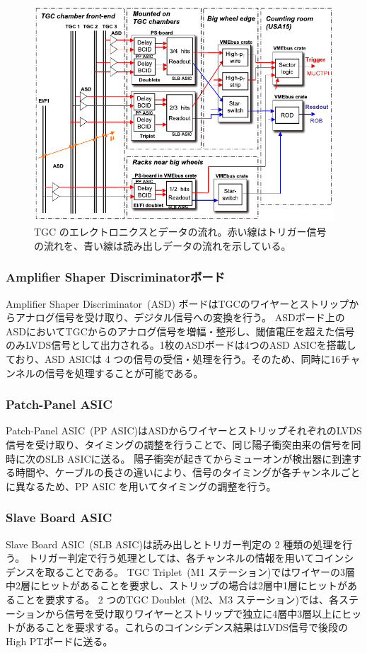 \begin{figure}[tb]
  \centering
  \includegraphics[clip, width=14cm]{fig/3/electronics.pdf}
  \caption{TGC のエレクトロニクスとデータの流れ\cite{Aad:1129811}。赤い線はトリガー信号の流れを、青い線は読み出しデータの流れを示している。}
  \label{fig:TGC_electro}
\end{figure}

\subsubsection{Amplifier Shaper Discriminatorボード}
Amplifier Shaper Discriminator~(ASD) ボードはTGCのワイヤーとストリップからアナログ信号を受け取り、デジタル信号への変換を行う。
ASDボード上のASDにおいてTGCからのアナログ信号を増幅・整形し、閾値電圧を超えた信号のみLVDS信号として出力される。1枚のASDボードは4つのASD ASICを搭載しており、ASD ASICは 4 つの信号の受信・処理を行う。そのため、同時に16チャンネルの信号を処理することが可能である。

\subsubsection{Patch-Panel ASIC}
Patch-Panel ASIC~(PP ASIC)はASDからワイヤーとストリップそれぞれのLVDS信号を受け取り、タイミングの調整を行うことで、同じ陽子衝突由来の信号を同時に次のSLB ASICに送る。
陽子衝突が起きてからミューオンが検出器に到達する時間や、ケーブルの長さの違いにより、信号のタイミングが各チャンネルごとに異なるため、PP ASIC を用いてタイミングの調整を行う。

\subsubsection{Slave Board ASIC}
Slave Board ASIC~(SLB ASIC)は読み出しとトリガー判定の 2 種類の処理を行う。
トリガー判定で行う処理としては、各チャンネルの情報を用いてコインシデンスを取ることである。
TGC Triplet~(M1 ステーション)ではワイヤーの3層中2層にヒットがあることを要求し、ストリップの場合は2層中1層にヒットがあることを要求する。
2 つのTGC Doublet~(M2、M3 ステーション)では、各ステーションから信号を受け取りワイヤーとストリップで独立に4層中3層以上にヒットがあることを要求する。これらのコインシデンス結果はLVDS信号で後段のHigh PTボードに送る。

